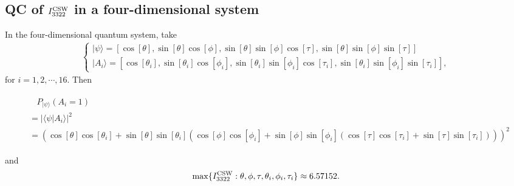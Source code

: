 \documentclass[pra,aps,notitlepage,superscriptaddress,showpacs,showkeys]{revtex4-1}
\theoremstyle{definition}
\theoremstyle{remark}
\begin{document}
\subsection{QC of $I_{3322}^{\rm CSW}$ in a four-dimensional system}




 In the four-dimensional quantum system, take
\begin{eqnarray}
\left\{
  \begin{array}{ll}
    |\psi\rangle=[\cos{[\theta]},\sin{[\theta]}\cos{[\phi]},
\sin{[\theta]}\sin{[\phi]}\cos{[\tau]},
\sin{[\theta]}\sin{[\phi]}\sin{[\tau]}] \\
    |A_i\rangle=[\cos{[\theta_i]},\sin{[\theta_i]}\cos{[\phi_i]},
\sin{[\theta_i]}\sin{[\phi_i]}\cos{[\tau_i]},
\sin{[\theta_i]}\sin{[\phi_i]}\sin{[\tau_i]}],
  \end{array}
\right.
\end{eqnarray}
for $i=1,2,\cdots, 16$. Then
\begin{widetext}
\begin{eqnarray}
\begin{split}
&~~~~P_{|\psi\rangle}(A_i=1)\\
&= |\langle \psi|A_i\rangle|^2\\
&=(\cos{[\theta]}\cos{[\theta_i]}+\sin{[\theta]}\sin{[\theta_i]}(\cos{[\phi]}\cos{[\phi_i]}
+\sin{[\phi]}\sin{[\phi_i]}(\cos{[\tau]}\cos{[\tau_i]}+\sin{[\tau]}\sin{[\tau_i]})))^2
\end{split}
\end{eqnarray}
\end{widetext} and
\begin{eqnarray}
\label{max}
\max\{I_{3322}^{\rm CSW}:\theta,\phi,\tau,\theta_i,\phi_i,\tau_i\}\approx 6.57152.
\end{eqnarray}
\end{document}
